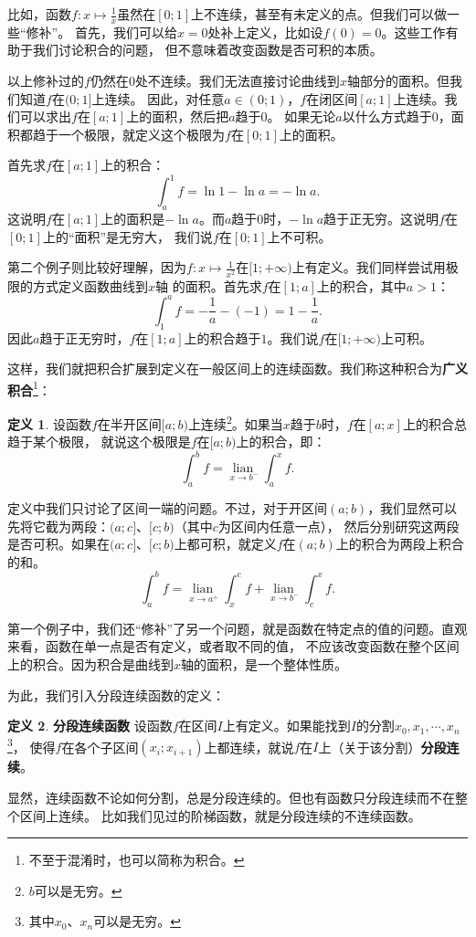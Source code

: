\documentclass[12pt,UTF8]{ctexbook}
\newcommand{\lian}[1]{
    \underset{#1}{\operatorname{lian}\,}
}
\theoremstyle{definition}
\newtheorem{df}{定义}[section]
\theoremstyle{plain}
\begin{document}
比如，函数$f: x\mapsto\frac{1}{x}$虽然在$[0;1]$上不连续，甚至有未定义的点。但我们可以做一些“修补”。
首先，我们可以给$x=0$处补上定义，比如设$f(0) = 0$。这些工作有助于我们讨论积合的问题，
但不意味着改变函数是否可积的本质。

以上修补过的$f$仍然在$0$处不连续。我们无法直接讨论曲线到$x$轴部分的面积。但我们知道$f$在$(0;1]$上连续。
因此，对任意$a\in(0;1)$，$f$在闭区间$[a;1]$上连续。我们可以求出$f$在$[a;1]$上的面积，然后把$a$趋于$0$。
如果无论$a$以什么方式趋于$0$，面积都趋于一个极限，就定义这个极限为$f$在$[0;1]$上的面积。

首先求$f$在$[a;1]$上的积合：
$$ \int_a^1 f = \ln{1} - \ln{a} = -\ln{a}. $$
这说明$f$在$[a;1]$上的面积是$-\ln{a}$。而$a$趋于$0$时，$-\ln{a}$趋于正无穷。这说明$f$在$[0;1]$上的“面积”是无穷大，
我们说$f$在$[0;1]$上不可积。

第二个例子则比较好理解，因为$f:x\mapsto \frac{1}{x^2}$在$[1;+\infty)$上有定义。我们同样尝试用极限的方式定义函数曲线到$x$轴
的面积。首先求$f$在$[1;a]$上的积合，其中$a>1$：
$$ \int_1^a f = -\frac{1}{a} - (-1) = 1 - \frac{1}{a}. $$
因此$a$趋于正无穷时，$f$在$[1;a]$上的积合趋于$1$。我们说$f$在$[1;+\infty)$上可积。

这样，我们就把积合扩展到定义在一般区间上的连续函数。我们称这种积合为\textbf{广义积合}\footnote{不至于混淆时，也可以简称为积合。}：
\begin{df}
    设函数$f$在半开区间$[a;b)$上连续\footnote{$b$可以是无穷。}。如果当$x$趋于$b$时，$f$在$[a;x]$上的积合总趋于某个极限，
    就说这个极限是$f$在$[a;b)$上的积合，即：
    $$ \int_a^b f = \lian{x\to b^-} \int_a^x f. $$
\end{df}

定义中我们只讨论了区间一端的问题。不过，对于开区间$(a;b)$，我们显然可以先将它截为两段：$(a;c]$、$[c;b)$（其中$c$为区间内任意一点），
然后分别研究这两段是否可积。如果在$(a;c]$、$[c;b)$上都可积，就定义$f$在$(a;b)$上的积合为两段上积合的和。
$$ \int_a^b f = \lian{x\to a^+} \int_x^c f + \lian{x\to b^-} \int_c^x f. $$ 

第一个例子中，我们还“修补”了另一个问题，就是函数在特定点的值的问题。直观来看，函数在单一点是否有定义，或者取不同的值，
不应该改变函数在整个区间上的积合。因为积合是曲线到$x$轴的面积，是一个整体性质。

为此，我们引入分段连续函数的定义：
\begin{df}{\textbf{分段连续函数}}
    设函数$f$在区间$I$上有定义。如果能找到$I$的分割$x_0, x_1, \cdots, x_n$\footnote{其中$x_0$、$x_n$可以是无穷。}，
    使得$f$在各个子区间$(x_i;x_{i+1})$上都连续，就说$f$在$I$上（关于该分割）\textbf{分段连续}。
\end{df}
显然，连续函数不论如何分割，总是分段连续的。但也有函数只分段连续而不在整个区间上连续。
比如我们见过的阶梯函数，就是分段连续的不连续函数。
\end{document}
